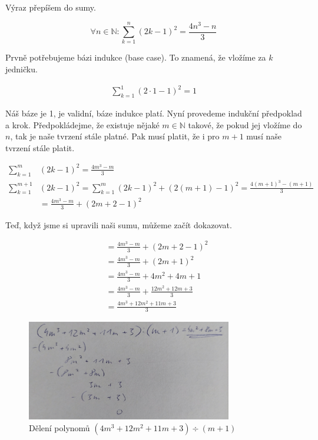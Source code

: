 
Výraz přepíšem do sumy.

$$ \forall n \in \mathbb{N}: \sum_{k = 1}^{n} (2k - 1)^2 = \frac{4n^3 - n}{3} $$ 

Prvně potřebujeme bázi indukce (base case). To znamená, že vložíme za $k$ jedničku.

\begin{align}
	\sum_{k = 1}^{1} (2 \cdot 1 - 1)^2 = 1
\end{align}

Náš báze je 1, je validní, báze indukce platí. Nyní provedeme indukční předpoklad a krok. Předpokládejme, že existuje nějaké $m \in \mathbb{N}$ takové, že pokud jej vložíme do $n$, tak je naše tvrzení stále platné. Pak musí platit, že i pro $m + 1$ musí naše tvrzení stále platit.

\begin{align}
	\sum_{k = 1}^{m}& (2k - 1)^2 = \frac{4m^3 - m}{3} \\
	\sum_{k = 1}^{m + 1}& (2k - 1)^2 
	= \sum_{k = 1}^{m} (2k - 1)^2 + (2(m + 1) - 1)^2
	= \frac{4(m + 1)^3 - (m + 1)}{3} \\ 
	&= \frac{4m^3 - m}{3} + (2m + 2 - 1)^2 
\end{align}

Teď, když jsme si upravili naši sumu, můžeme začít dokazovat. 

\begin{align}
	&= \frac{4m^3 - m}{3} + (2m + 2 - 1)^2 \\
	&= \frac{4m^3 - m}{3} + (2m + 1)^2 \\
	&= \frac{4m^3 - m}{3} + 4m^2 + 4m + 1 \\
	&= \frac{4m^3 - m}{3} + \frac{12m^2 + 12m + 3}{3} \\
	&= \frac{4m^3 + 12m^2 + 11m + 3}{3}
\end{align}

\begin{figure}[h]
	\centering
	\caption{Dělení polynomů $(4m^3 + 12m^2 + 11m + 3) \div (m + 1)$}
	\includegraphics[width=0.8\textwidth]{assets/a1.jpg}
\end{figure}

